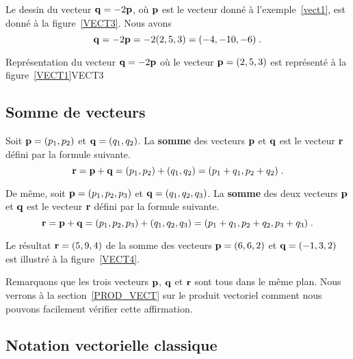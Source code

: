 {\begin{egg}
Le dessin du vecteur $\displaystyle \mathbf{q} = -2 \mathbf{p}$, où
$\mathbf{p}$ est le vecteur donné à l'exemple~\ref{vect1}, est donné à la
figure~\ref{VECT3}.  Nous avons
\[
\mathbf{q} = -2 \mathbf{p} = -2 (2, 5, 3) = (-4,-10,-6) \; .
\]
\end{egg}

{Représentation du vecteur $\mathbf{q} = -2\mathbf{p}$ où le vecteur
$\mathbf{p}=(2,5,3)$ est représenté à la figure~\ref{VECT1}}{VECT3}

\subsection{Somme de vecteurs}

\begin{defn} 
Soit $\mathbf{p} = (p_1,p_2)$ et $\mathbf{q} = (q_1, q_2)$.  La
{\bfseries somme} des vecteurs $\mathbf{p}$ et $\mathbf{q}$ est le
vecteur $\mathbf{r}$ défini par la formule suivante.
\[
\mathbf{r} = \mathbf{p} + \mathbf{q} = ( p_1, p_2) + (q_1, q_2)
= (p_1+q_1, p_2+q_2) \; .
\]

De même, soit $\mathbf{p} = (p_1,p_2,p_3)$ et $\mathbf{q} = (q_1, q_2, q_3)$.
La {\bfseries somme} des deux vecteurs $\mathbf{p}$ et
$\mathbf{q}$ est le vecteur $\mathbf{r}$ défini par la formule suivante.
\[
\mathbf{r} = \mathbf{p} + \mathbf{q} = ( p_1, p_2, p_3) + (q_1, q_2, q_3)
= (p_1+q_1, p_2+q_2, p_3+q_3) \; .
\]
\end{defn}

\begin{egg}
Le résultat $\mathbf{r} = (5,9,4)$ de la somme des vecteurs $\mathbf{p} = (6,6,2)$
et $\mathbf{q} = (-1, 3, 2)$ est illustré à la figure~\ref{VECT4}.

Remarquons que les trois vecteurs $\mathbf{p}$, $\mathbf{q}$ et $\mathbf{r}$ sont
tous dans le même plan.  Nous verrons à la section~\ref{PROD_VECT} sur
le produit vectoriel comment nous pouvons facilement vérifier cette
affirmation.
\label{EX_SUM}
\end{egg}


\subsection{Notation vectorielle classique}

}
